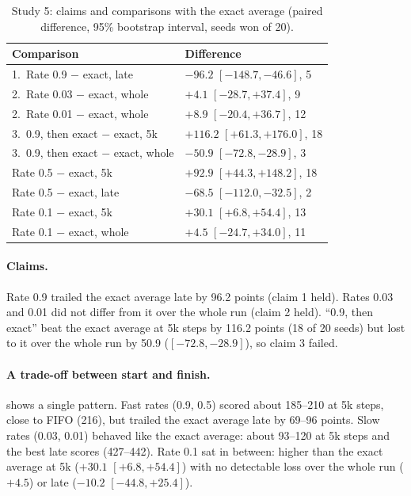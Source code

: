 \documentclass{article}
\begin{document}
\begin{table}[t]
\caption{Study 5: claims and comparisons with the exact average (paired
difference, 95\% bootstrap interval, seeds won of 20).}
\label{tab:rate}
\centering
\small
\begin{tabular}{ll}
\toprule
Comparison & Difference \\
\midrule
1.\ Rate 0.9 $-$ exact, late & $-96.2$ $[-148.7, -46.6]$, 5 \\
2.\ Rate 0.03 $-$ exact, whole & $+4.1$ $[-28.7, +37.4]$, 9 \\
2.\ Rate 0.01 $-$ exact, whole & $+8.9$ $[-20.4, +36.7]$, 12 \\
3.\ 0.9, then exact $-$ exact, 5k & $+116.2$ $[+61.3, +176.0]$, 18 \\
3.\ 0.9, then exact $-$ exact, whole & $-50.9$ $[-72.8, -28.9]$, 3 \\
\midrule
\quad Rate 0.5 $-$ exact, 5k & $+92.9$ $[+44.3, +148.2]$, 18 \\
\quad Rate 0.5 $-$ exact, late & $-68.5$ $[-112.0, -32.5]$, 2 \\
\quad Rate 0.1 $-$ exact, 5k & $+30.1$ $[+6.8, +54.4]$, 13 \\
\quad Rate 0.1 $-$ exact, whole & $+4.5$ $[-24.7, +34.0]$, 11 \\
\bottomrule
\end{tabular}
\end{table}

\paragraph{Claims.} Rate 0.9 trailed the exact average late by 96.2 points
(claim 1 held). Rates 0.03 and 0.01 did not differ from it over the whole run
(claim 2 held). ``0.9, then exact'' beat the exact average at 5k steps by
116.2 points (18 of 20 seeds) but lost to it over the whole run by 50.9
($[-72.8, -28.9]$), so claim 3 failed.

\paragraph{A trade-off between start and finish.}  shows a
single pattern. Fast rates (0.9, 0.5) scored about 185--210 at 5k steps, close to
FIFO (216), but trailed the exact average late by 69--96 points. Slow rates
(0.03, 0.01) behaved like the exact average: about 93--120 at 5k steps and
the best late scores (427--442). Rate 0.1 sat in between: higher than the
exact average at 5k ($+30.1$ $[+6.8, +54.4]$) with no detectable loss over
the whole run ($+4.5$) or late ($-10.2$ $[-44.8, +25.4]$).
\end{document}
